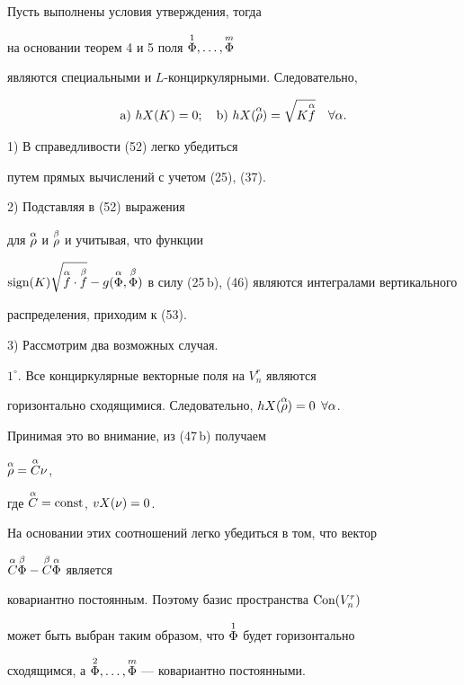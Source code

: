 \begin{pf}


Пусть выполнены условия утверждения, тогда


на основании теорем 4 и 5 поля $\overset{1}{\Phi}{},\dotsc,\overset{m}{\Phi}{}$


являются специальными и $L$-конциркулярными. Следовательно,


$$


\mathrm a)\ hX(K)=0;\quad


\mathrm b)\ hX( \os {\ro}\a)=\sqrt {K\os {f}\a}\quad \fl \a.


$$





1) В справедливости (52) легко убедиться


путем прямых вычислений с учетом (25), (37).





2) Подставляя в (52) выражения


для $\overset{\alpha}{\rho}{}$ и $\overset{\beta}{\rho}{}$ и учитывая, что функции


$\text{sign}(K)\sqrt{\os {f}\a\cdot\os {f}\be}-g(\os {\F}\a,\os


{\F}\be)$ в силу (25\,b), (46) являются интегралами вертикального


распределения, приходим к (53).





3) Рассмотрим два возможных случая.





$1^\circ$. Все конциркулярные векторные поля на $V^r_n$ являются


горизонтально сходящимися. Следовательно, $hX(\overset{\alpha}{\rho}{})=0$ $\forall \alpha$.


Принимая это во внимание, из (47\,b) получаем


$\overset{\alpha}{\rho}{}=\overset{\alpha}{C}{} \nu$,


где $\overset{\alpha}{C}{}=\text{const}$, $vX(\nu)=0$.


На основании этих соотношений легко убедиться в том, что вектор


$\overset{\alpha}{C}{}\overset{\beta}{\Phi}{}- \overset{\beta}{C}{}\overset{\alpha}{\Phi}{}$ является


ковариантно постоянным. Поэтому базис пространства $\operatorname{Con}(V^r_n)$


может быть выбран таким образом, что $\overset{1}{\Phi}{}$ будет горизонтально


сходящимся, а $\overset{2}{\Phi}{},\dotsc,\overset{m}{\Phi}{}$ --- ковариантно постоянными.



\end{pf}
